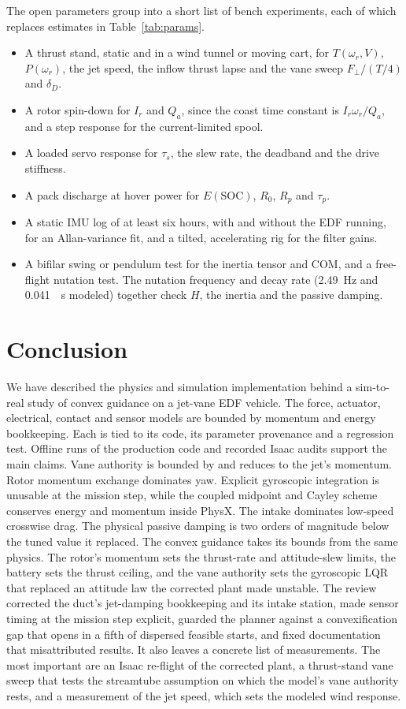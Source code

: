\documentclass[journal]{IEEEtran}
\newcommand{\reftab}[1]{Table~\ref{#1}}
\newcommand{\Ir}{I_r}
\newcommand{\wrot}{\omega_r}
\begin{document}
The open parameters group into a short list of bench experiments, each of which replaces estimates in \reftab{tab:params}.
\begin{itemize}
\item A thrust stand, static and in a wind tunnel or moving cart, for $T(\wrot, V)$, $P(\wrot)$, the jet speed, the inflow thrust lapse and the vane sweep $F_\perp/(T/4)$ and $\delta_D$.
\item A rotor spin-down for $\Ir$ and $Q_a$, since the coast time constant is $\Ir\wrot/Q_a$, and a step response for the current-limited spool.
\item A loaded servo response for $\tau_s$, the slew rate, the deadband and the drive stiffness.
\item A pack discharge at hover power for $E(\mathrm{SOC})$, $R_0$, $R_p$ and $\tau_p$.
\item A static IMU log of at least six hours, with and without the EDF running, for an Allan-variance fit, and a tilted, accelerating rig for the filter gains.
\item A bifilar swing or pendulum test for the inertia tensor and COM, and a free-flight nutation test.
The nutation frequency and decay rate (\SI{2.49}{\hertz} and \SI{0.041}{\per\second} modeled) together check $H$, the inertia and the passive damping.
\end{itemize}

\section{Conclusion}
\label{sec:conclusion}

We have described the physics and simulation implementation behind a sim-to-real study of convex guidance on a jet-vane EDF vehicle.
The force, actuator, electrical, contact and sensor models are bounded by momentum and energy bookkeeping.
Each is tied to its code, its parameter provenance and a regression test.
Offline runs of the production code and recorded Isaac audits support the main claims.
Vane authority is bounded by and reduces to the jet's momentum.
Rotor momentum exchange dominates yaw.
Explicit gyroscopic integration is unusable at the mission step, while the coupled midpoint and Cayley scheme conserves energy and momentum inside PhysX.
The intake dominates low-speed crosswise drag.
The physical passive damping is two orders of magnitude below the tuned value it replaced.
The convex guidance takes its bounds from the same physics.
The rotor's momentum sets the thrust-rate and attitude-slew limits, the battery sets the thrust ceiling, and the vane authority sets the gyroscopic LQR that replaced an attitude law the corrected plant made unstable.
The review corrected the duct's jet-damping bookkeeping and its intake station, made sensor timing at the mission step explicit, guarded the planner against a convexification gap that opens in a fifth of dispersed feasible starts, and fixed documentation that misattributed results.
It also leaves a concrete list of measurements.
The most important are an Isaac re-flight of the corrected plant, a thrust-stand vane sweep that tests the streamtube assumption on which the model's vane authority rests, and a measurement of the jet speed, which sets the modeled wind response.
\end{document}
